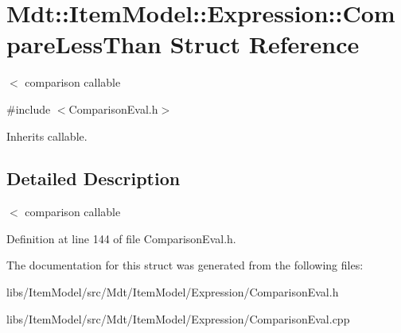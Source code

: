 \hypertarget{struct_mdt_1_1_item_model_1_1_expression_1_1_compare_less_than}{}\section{Mdt\+:\+:Item\+Model\+:\+:Expression\+:\+:Compare\+Less\+Than Struct Reference}
\label{struct_mdt_1_1_item_model_1_1_expression_1_1_compare_less_than}


$<$ comparison callable  




{\ttfamily \#include $<$Comparison\+Eval.\+h$>$}



Inherits callable.



\subsection{Detailed Description}
$<$ comparison callable 

Definition at line 144 of file Comparison\+Eval.\+h.



The documentation for this struct was generated from the following files\+:\begin{DoxyCompactItemize}
\item 
libs/\+Item\+Model/src/\+Mdt/\+Item\+Model/\+Expression/Comparison\+Eval.\+h\item 
libs/\+Item\+Model/src/\+Mdt/\+Item\+Model/\+Expression/Comparison\+Eval.\+cpp\end{DoxyCompactItemize}

